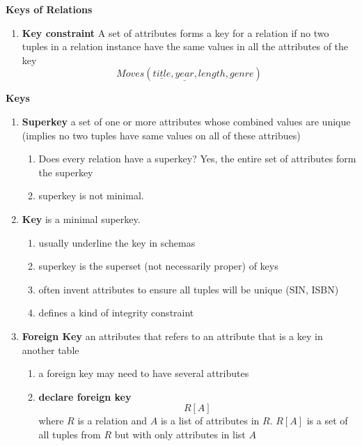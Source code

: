 \documentclass[11pt]{article}
\begin{document}
\begin{defn*}
    \textbf{Keys of Relations} 
    \begin{enumerate}
        \item \textbf{Key constraint} A set of attributes forms a key for a relation if no two tuples in a relation instance have the same values in all the attributes of the key
        \[
            Moves(\underline{title}, \underline{year}, length, genre)
        \]
    \end{enumerate}
\end{defn*}







\begin{defn*}
    \textbf{Keys}
    \begin{enumerate}
        \item \textbf{Superkey} a set of one or more attributes whose combined values are unique (implies no two tuples have same values on all of these attribues)
        \begin{enumerate}
            \item Does every relation have a superkey? Yes, the entire set of attributes form the superkey 
            \item superkey is not minimal. 
        \end{enumerate}
        \item \textbf{Key} is a minimal superkey.
        \begin{enumerate}
            \item usually underline the key in schemas
            \item superkey is the superset (not necessarily proper) of keys
            \item often invent attributes to ensure all tuples will be unique (SIN, ISBN)
            \item defines a kind of integrity constraint
        \end{enumerate}
        \item \textbf{Foreign Key} an attributes that refers to an attribute that is a key in another table 
        \begin{enumerate}
            \item a foreign key may need to have several attributes
            \item \textbf{declare foreign key} 
            \[
                R[A]
            \] 
            where $R$ is a relation and $A$ is a list of attributes in $R$. $R[A]$ is a set of all tuples from $R$ but with only attributes in list $A$

\end{enumerate}
\end{enumerate}
\end{defn*}
\end{document}
